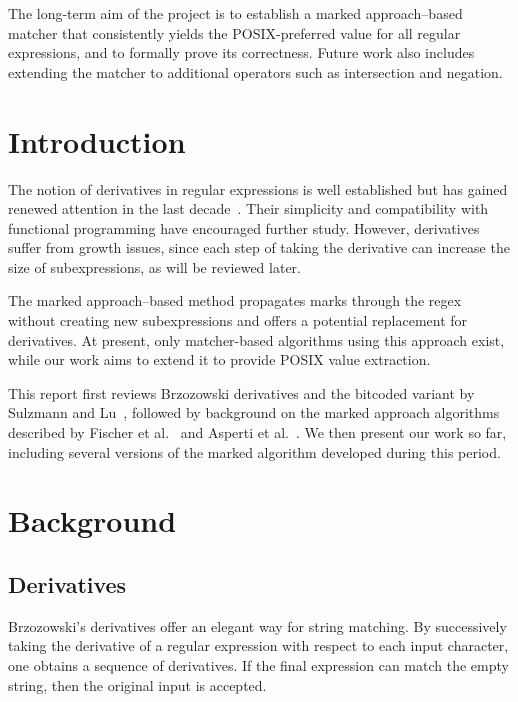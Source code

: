 \documentclass[12pt]{article}
\begin{document}
The long-term aim of the project is to establish a marked approach--based matcher that consistently yields the POSIX-preferred value for all regular expressions, and to formally prove its correctness.  
Future work also includes extending the matcher to additional operators such as intersection and negation.  

\newpage

\tableofcontents

\newpage

\section{Introduction}

The notion of derivatives in regular expressions is well established but has gained renewed attention in the last decade~\cite{Owens2009, Might2011}.  
Their simplicity and compatibility with functional programming have encouraged further study.  
However, derivatives suffer from growth issues, since each step of taking the derivative can increase the size of subexpressions, as will be reviewed later.  

The marked approach--based method propagates marks through the regex without creating new subexpressions and offers a potential replacement for derivatives.  
At present, only matcher-based algorithms using this approach exist, while our work aims to extend it to provide POSIX value extraction.  

This report first reviews Brzozowski derivatives and the bitcoded variant by Sulzmann and Lu~\cite{Sulzmann2014}, followed by background on the marked approach algorithms described by Fischer et al.~\cite{Fischer2010} and Asperti et al.~\cite{Asperti2010}.  
We then present our work so far, including several versions of the marked algorithm developed during this period.  

\section{Background}
\subsection{Derivatives}

Brzozowski’s derivatives offer an elegant way for string matching. By successively taking the derivative of a regular
expression with respect to each input character, one obtains a sequence of derivatives. If the final expression can match 
the empty string, then the original input is accepted.
\end{document}
